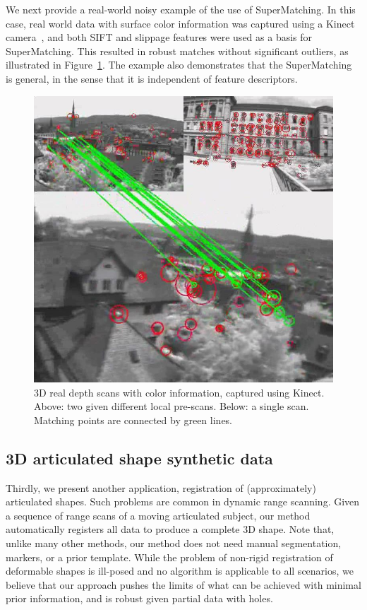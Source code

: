 We next provide a real-world noisy example of the use of SuperMatching.
In this case, real world data with surface color information was captured using a Kinect camera~\cite{Kinect12},
and both SIFT and slippage features were used as a basis for SuperMatching.
This resulted in robust matches without significant outliers, as illustrated in Figure~\ref{fig:3DReal}.
The example also demonstrates that the SuperMatching is general, in the sense that it is independent of feature descriptors.

\begin{figure}[h]
\centering
  \includegraphics[width=0.9\linewidth]{figures/3DReal.jpg}
  \caption{3D real depth scans with color information, captured using Kinect.
  Above: two given different local pre-scans.  Below: a single scan.
  Matching points are connected by green lines.}
\label{fig:3DReal}
\end{figure}

\subsection{3D articulated shape synthetic data}
\label{subsec:3darticulated}

Thirdly, we present another application, registration of (approximately) articulated shapes. Such problems are common in dynamic range scanning.
Given a sequence of range scans of a moving articulated subject, our method automatically registers all data to produce a complete 3D shape.
Note that, unlike many other methods, our method does not need  manual segmentation,  markers, or a prior template.
While the problem of non-rigid registration of deformable shapes is ill-posed and no algorithm is applicable to all scenarios,
we believe that our approach pushes the limits of what can be achieved with minimal prior information, and is robust given partial data with holes.

